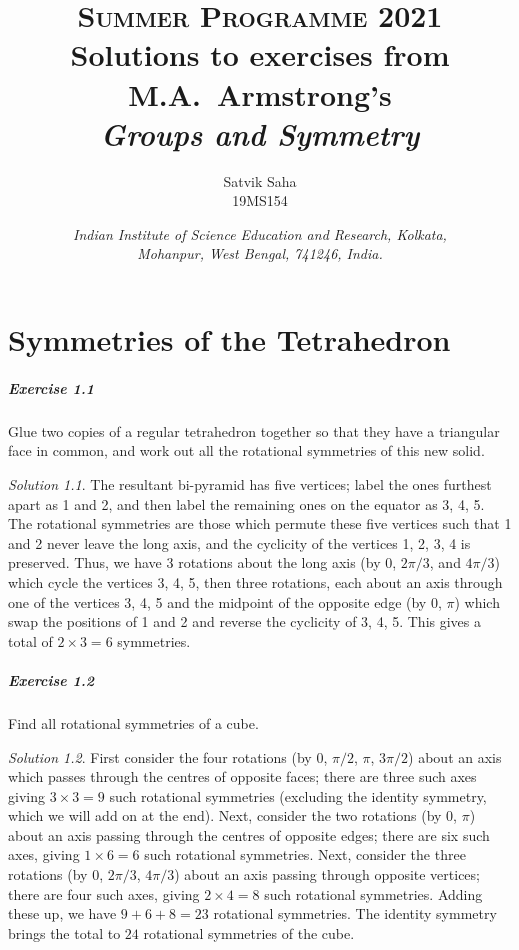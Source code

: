 \documentclass[11pt]{report}
\title{
    \Large\textsc{Summer Programme 2021} \\
    \vspace{10pt}
    \huge Solutions to exercises from M.A.~Armstrong's \\
    \textit{Groups and Symmetry} 
}
\author{
    \large Satvik Saha%
    \\\textsc{\small 19MS154}
}
\date{\normalsize
    \textit{Indian Institute of Science Education and Research, Kolkata, \\
    Mohanpur, West Bengal, 741246, India.} \\
}
\theoremstyle{remark}
\newtheorem*{solution}{Solution}
\begin{document}
    \maketitle

    \chapter{Symmetries of the Tetrahedron}

    \paragraph{Exercise 1.1} Glue two copies of a regular tetrahedron together so
    that they have a triangular face in common, and work out all the rotational
    symmetries of this new solid.
    \begin{solution}
        The resultant bi-pyramid has five vertices; label the ones furthest apart as
        1 and 2, and then label the remaining ones on the equator as 3, 4, 5. The
        rotational symmetries are those which permute these five vertices such that
        1 and 2 never leave the long axis, and the cyclicity of the vertices 1, 2,
        3, 4 is preserved. Thus, we have 3 rotations about the long axis (by $0$,
        $2\pi / 3$, and $4\pi / 3$) which cycle the vertices 3, 4, 5, then three
        rotations, each about an axis through one of the vertices 3, 4, 5 and the
        midpoint of the opposite edge (by $0$, $\pi$) which swap the positions of 1
        and 2 and reverse the cyclicity of 3, 4, 5. This gives a total of $2\times 3
        = 6$ symmetries.
    \end{solution}

    \paragraph{Exercise 1.2} Find all rotational symmetries of a cube.
    \begin{solution}
        First consider the four rotations (by $0$, $\pi / 2$, $\pi$, $3\pi / 2$)
        about an axis which passes through the centres of opposite faces; there are
        three such axes giving $3\times 3 = 9$ such rotational symmetries (excluding
        the identity symmetry, which we will add on at the end).
        Next, consider the two rotations (by $0$, $\pi$) about an axis passing
        through the centres of opposite edges; there are six such axes, giving
        $1\times 6 = 6$ such rotational symmetries.
        Next, consider the three rotations (by $0$, $2\pi / 3$, $4\pi / 3$) about an
        axis passing through opposite vertices; there are four such axes, giving
        $2\times 4 = 8$ such rotational symmetries. Adding these up, we have $9 + 6
        + 8 = 23$ rotational symmetries. The identity symmetry brings the total to
        $24$ rotational symmetries of the cube.
    \end{solution}
\end{document}
